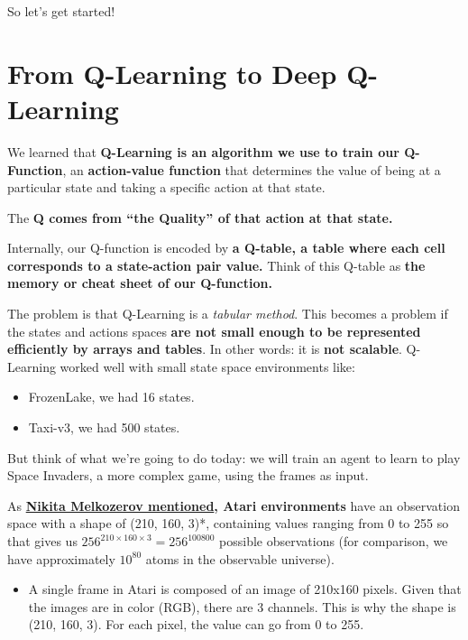 \documentclass[11pt,a4paper]{article}
\begin{document}
So let's get started!

\section{From Q-Learning to Deep Q-Learning}\label{from-q-learning-to-deep-q-learning}

We learned that \textbf{Q-Learning is an algorithm we use to train our Q-Function}, an \textbf{action-value function} that determines the value of being at a particular state and taking a specific action at that state.


The \textbf{Q comes from ``the Quality'' of that action at that state.}

Internally, our Q-function is encoded by \textbf{a Q-table, a table where each cell corresponds to a state-action pair value.} Think of this Q-table as \textbf{the memory or cheat sheet of our Q-function.}

The problem is that Q-Learning is a \emph{tabular method}. This becomes a problem if the states and actions spaces \textbf{are not small enough to be represented efficiently by arrays and tables}. In other words: it is \textbf{not scalable}. Q-Learning worked well with small state space environments like:

\begin{itemize}
\tightlist
\item
  FrozenLake, we had 16 states.
\item
  Taxi-v3, we had 500 states.
\end{itemize}

But think of what we're going to do today: we will train an agent to learn to play Space Invaders, a more complex game, using the frames as input.

As \textbf{\href{https://twitter.com/meln1k}{Nikita Melkozerov mentioned}, Atari environments} have an observation space with a shape of (210, 160, 3)*, containing values ranging from 0 to 255 so that gives us \(256^{210 \times 160 \times 3} = 256^{100800}\) possible observations (for comparison, we have approximately \(10^{80}\) atoms in the observable universe).

\begin{itemize}
\tightlist
\item
  A single frame in Atari is composed of an image of 210x160 pixels. Given that the images are in color (RGB), there are 3 channels. This is why the shape is (210, 160, 3). For each pixel, the value can go from 0 to 255.
\end{itemize}
\end{document}
